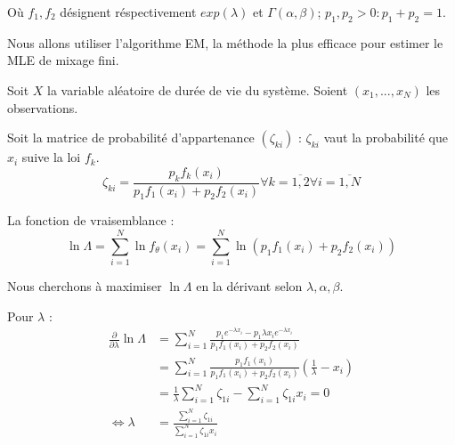 \documentclass[10pt,a4paper]{article}
\begin{document}
Où $f_1, f_2$ désignent réspectivement $exp(\lambda)$ et $\Gamma(\alpha, \beta)$; $p_1, p_2 > 0: p_1 + p_2 = 1$.

Nous allons utiliser l'algorithme EM, la méthode la plus efficace pour estimer le MLE de mixage fini.

Soit $X$ la variable aléatoire de durée de vie du système. Soient $\left( {{x_1},...,{x_N}} \right)$ les observations.

Soit la matrice de probabilité d'appartenance $(\zeta_{ki})$ : $\zeta_{ki}$ vaut la probabilité que $x_i$ suive la loi $f_k$.
\begin{equation}
    \label{zeta}
    {\zeta _{ki}} = \frac{{{p_k}{f_k}\left( {{x_i}} \right)}}{{{p_1}{f_1}\left( {{x_i}} \right) + {p_2}{f_2}\left( {{x_i}} \right)}}\forall k = \overline {1,2} \forall i = \overline {1,N}
\end{equation}

La fonction de vraisemblance : 
\begin{equation}
    \label{funlik}
    \ln \Lambda  = \sum\limits_{i = 1}^N {\ln {f_\theta }\left( {{x_i}} \right)}  = \sum\limits_{i = 1}^N {\ln \left( {{p_1}{f_1}\left( {{x_i}} \right) + {p_2}{f_2}\left( {{x_i}} \right)} \right)}
\end{equation}

Nous cherchons à maximiser $\ln \Lambda$ en la dérivant selon $\lambda, \alpha, \beta$.

Pour $\lambda$ :
\begin{align}
    \frac{\partial }{{\partial \lambda }}\ln \Lambda  & = \sum\limits_{i = 1}^N {\frac{{{p_1}{e^{ - \lambda {x_i}}} - {p_1}\lambda {x_i}{e^{ - \lambda {x_i}}}}}{{{p_1}{f_1}\left( {{x_i}} \right) + {p_2}{f_2}\left( {{x_i}} \right)}}} \nonumber \\
    & = \sum\limits_{i = 1}^N {\frac{{{p_1}{f_1}\left( {{x_i}} \right)}}{{{p_1}{f_1}\left( {{x_i}} \right) + {p_2}{f_2}\left( {{x_i}} \right)}}\left( {\frac{1}{\lambda } - {x_i}} \right)} \nonumber  \\
    & = \frac{1}{\lambda }\sum\limits_{i = 1}^N {{\zeta _{1i}}}  - \sum\limits_{i = 1}^N {{\zeta _{1i}}{x_i}}  = 0 \nonumber \\
    \label{lambda}
    \Leftrightarrow \lambda  & = \frac{{\sum\limits_{i = 1}^N {{\zeta _{1i}}} }}{{\sum\limits_{i = 1}^N {{\zeta _{1i}}{x_i}} }}
\end{align}
\end{document}
